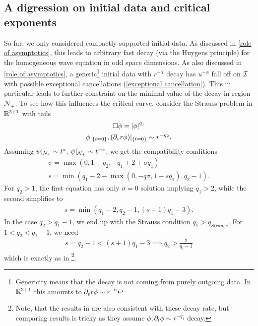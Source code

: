 \documentclass[11pt, oneside]{amsart}
\begin{document}
	\subsection{A digression on initial data and critical exponents}\label{initial data critical exponent}
	So far, we only considered compactly supported initial data. As discussed in \cref{role of asymptotics}, this leads to arbitrary fast decay (via the Huygens principle) for the homogeneous wave equation in odd space dimensions. As also discussed in \cref{role of asymptotics}, a generic\footnote{Genericity means that the decay is not coming from purely outgoing data. In $\mathbb{R}^{3+1}$ this amounts to $\partial_v r\phi\sim r^{-\alpha}$} initial data with $r^{-\alpha}$ decay has $u^{-\alpha}$ fall off on $\mathcal{I}$ with possible exceptional cancellations (\cref{exceptional cancellation}). This in particular leads to further constraint on the minimal value of the decay in  region $\mathcal{N}_+$. To see how this influences the critical curve, consider the Strauss problem in $\mathbb{R}^{3+1}$ with tails
	\begin{equation*}
		\begin{gathered}
			\Box\phi=\left\lvert \phi\right\rvert^{q_1}\\
			\phi|_{\{t=0\}},(\partial_v r\phi)|_{\{t=0\}}\sim r^{-q_2}.
		\end{gathered}
	\end{equation*}
	Assuming $\psi|_{\mathcal{N}_{\mathcal{I}}}\sim t^{\sigma},\,\psi|_{\mathcal{N}_+}\sim t^{-s}$, we get the compatibility conditions
	\begin{equation*}
		\begin{gathered}
			\sigma=\max(0,1-q_2,-q_1+2+\sigma q_1)\\
			s=\min(q_1-2-\max(0,-q\sigma,1-sq_1),q_2-1).
		\end{gathered}
	\end{equation*}
	For $q_2>1$, the first equation has only $\sigma=0$ solution implying $q_1>2$, while the second simplifies to
	\begin{equation*}
		\begin{gathered}
		s=\min(q_1-2,q_2-1,(s+1)q_1-3).
		\end{gathered}
	\end{equation*}
	In the case $q_2>q_1-1$, we end up with the Strauss condition $q_1>q_{Strauss}$. For $1<q_2<q_1-1$, we need 
	\begin{equation*}
		\begin{gathered}
			s=q_2-1<(s+1)q_1-3\implies q_2>\frac{2}{q_1-1}
		\end{gathered}
	\end{equation*}
	which is exactly as in \cite{karageorgis_existence_2005}\footnote{Note, that the results in \cite{strauss_existence_1997} are also consistent with these decay rate, but comparing results is tricky as they assume $\phi,\partial_t\phi\sim r^{-q_2}$ decay.}.
	
\end{document}
